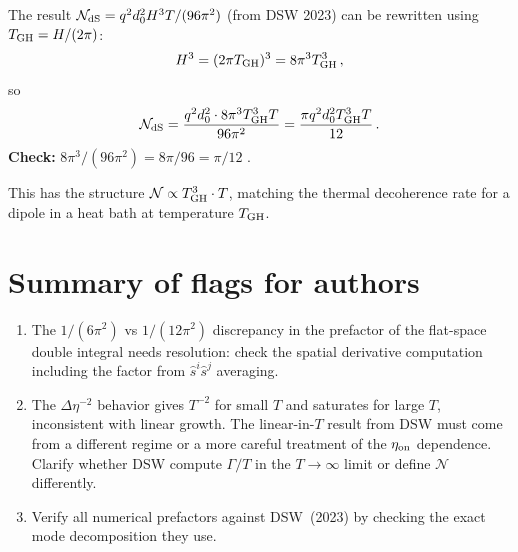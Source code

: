 \documentclass[12pt]{article}
\newcommand{\Nnum}{\mathcal{N}}
\begin{document}
The result $\Nnum_{\rm dS} = q^{2}d_{0}^{2}H^{3}T/(96\pi^{2})$ (from DSW 2023)
can be rewritten using $T_{\rm GH} = H/(2\pi)$:
%
\begin{equation}
  H^{3} = (2\pi T_{\rm GH})^{3} = 8\pi^{3}T_{\rm GH}^{3} \,,
\end{equation}
%
so
%
\begin{equation}
  \Nnum_{\rm dS}
  =
  \frac{q^{2}d_{0}^{2}\cdot 8\pi^{3}T_{\rm GH}^{3}T}{96\pi^{2}}
  =
  \frac{\pi q^{2}d_{0}^{2}T_{\rm GH}^{3}T}{12} \,.
  \label{eq:N-dS-TGH}
\end{equation}
%
\textbf{Check:} $8\pi^{3}/(96\pi^{2}) = 8\pi/96 = \pi/12$ \checkmark.

This has the structure $\Nnum \propto T_{\rm GH}^{3}\cdot T$, matching the thermal
decoherence rate for a dipole in a heat bath at temperature $T_{\rm GH}$.

\section*{Summary of flags for authors}

\begin{enumerate}
\item The $1/(6\pi^{2})$ vs $1/(12\pi^{2})$ discrepancy in the prefactor of the
  flat-space double integral needs resolution: check the spatial derivative
  computation including the factor from $\hat{s}^{i}\hat{s}^{j}$ averaging.

\item The $\Delta\eta^{-2}$ behavior gives $T^{-2}$ for small $T$ and saturates
  for large $T$, inconsistent with linear growth.  The linear-in-$T$ result from DSW
  must come from a different regime or a more careful treatment of the $\eta_{\rm on}$
  dependence.  Clarify whether DSW compute $\Gamma/T$ in the $T\to\infty$ limit or
  define $\Nnum$ differently.

\item Verify all numerical prefactors against DSW~(2023) by checking the exact mode
  decomposition they use.
\end{enumerate}
\end{document}
